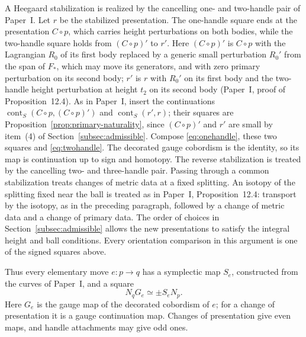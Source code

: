 \documentclass[11pt]{amsart}
\theoremstyle{definition}
\theoremstyle{remark}
\theoremstyle{plain}
\numberwithin{equation}{section}
\newcommand{\cont}{\operatorname{cont}}
\begin{document}
A Heegaard stabilization is realized
by the cancelling one- and two-handle
pair of Paper~I. Let $r$ be the
stabilized presentation. The one-handle
square ends at the presentation $C\circ p$,
which carries height perturbations on
both bodies, while the two-handle square
holds from $(C\circ p)'$ to $r'$. Here
$(C\circ p)'$ is $C\circ p$ with the Lagrangian $R_0$ of its first body replaced by a generic small perturbation $R_0'$
from the span of $F_*$, which may move its
generators, and with
zero primary perturbation on its second body;
$r'$ is $r$ with $R_0'$ on its first body and
the two-handle height perturbation at height
$t_2$ on its second body (Paper~I, proof of
Proposition~12.4). As in Paper~I, insert the
continuations $\cont_S(C\circ p,(C\circ p)')$
and $\cont_S(r',r)$; their squares are
Proposition~\ref{prop:primary-naturality},
since $(C\circ p)'$ and $r'$ are
small by item~(4) of
Section~\ref{subsec:admissible}. Compose
\eqref{eq:onehandle}, these two squares
and \eqref{eq:twohandle}. The decorated
gauge cobordism is the identity,
so its map is continuation up to
sign and homotopy. The reverse
stabilization is treated by the
cancelling two- and three-handle
pair. Passing through a common
stabilization treats changes of
metric data at a fixed splitting. An
isotopy of the splitting fixed near the
ball is treated as in Paper~I,
Proposition~12.4: transport by the
isotopy, as in the preceding paragraph,
followed by a change of metric data and
a change of primary data. The order of
choices in Section~\ref{subsec:admissible}
allows
the new presentations to satisfy the
integral height and ball conditions.
Every orientation comparison in this
argument is one of the signed squares
above.

Thus every elementary move $e:p\to q$ has a
symplectic map $S_e$, constructed from the
curves of Paper~I, and a square
\begin{equation}\label{eq:edge-square}
 N_qG_e\simeq\pm S_eN_p.
\end{equation}
Here $G_e$ is the gauge map of the decorated
cobordism of $e$; for a change of presentation
it is a gauge continuation map. Changes of
presentation give even maps, and handle
attachments may give odd ones.
\end{document}

